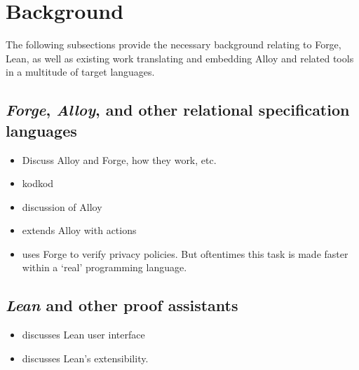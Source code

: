 \section{Background}

The following subsections provide the necessary background relating to Forge, Lean, as well as existing work translating and embedding Alloy and related tools in a multitude of target languages. 

\subsection{\emph{Forge}, \emph{Alloy}, and other relational specification languages}\label{sec:bg-forge}
\begin{itemize}
    \item Discuss Alloy and Forge, how they work, etc. 
    \item \cite{torlak2007kodkod} kodkod
    \item \cite{torlak2013applications} discussion of Alloy
    \item \cite{frias2005dynalloy} extends Alloy with actions
    \item \cite{srajesh-honorsthesis,lzhu-honorsthesis} uses Forge to verify privacy policies. But oftentimes this task is made faster within a `real' programming language. 
\end{itemize}

\subsection{\emph{Lean} and other proof assistants}\label{sec:bg-lean}
\begin{itemize}
    \item \cite{nawrocki2023extensible} discusses Lean user interface
    \item \cite{moura2021lean} discusses Lean's extensibility. 
\end{itemize}

